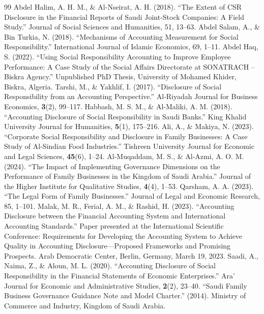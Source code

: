 \documentclass{NSP1}
\begin{document}
\begin{thebibliography}{99}
 Abdel Halim, A. H. M., \& Al-Nseirat, A. H. (2018). ``The Extent of CSR Disclosure in the Financial Reports of Saudi Joint-Stock Companies: A Field Study.'' Journal of Social Sciences and Humanities, 51, 13--63.
 Abdel Salam, A., \& Bin Turkia, N. (2018). ``Mechanisms of Accounting Measurement for Social Responsibility.'' International Journal of Islamic Economics, 69, 1--11.
 Abdel Haq, S. (2022). ``Using Social Responsibility Accounting to Improve Employee Performance: A Case Study of the Social Affairs Directorate at SONATRACH -- Biskra Agency.'' Unpublished PhD Thesis, University of Mohamed Khider, Biskra, Algeria.
 Tarshi, M., \& Yakhlif, I. (2017). ``Disclosure of Social Responsibility from an Accounting Perspective.'' Al-Riyadah Journal for Business Economics, \textbf{3}(2), 99--117.
 Habbash, M. S. M., \& Al-Maliki, A. M. (2018). ``Accounting Disclosure of Social Responsibility in Saudi Banks.'' King Khalid University Journal for Humanities, \textbf{5}(1), 175--216.
 Ali, A., \& Makiya, N. (2023). ``Corporate Social Responsibility and Disclosure in Family Businesses: A Case Study of Al-Sindian Food Industries.'' Tishreen University Journal for Economic and Legal Sciences, \textbf{45}(6), 1--24.
 Al-Muqaddam, M. S., \& Al-Azmi, A. O. M. (2024). ``The Impact of Implementing Governance Dimensions on the Performance of Family Businesses in the Kingdom of Saudi Arabia.'' Journal of the Higher Institute for Qualitative Studies, \textbf{4}(4), 1--53.
 Qarsham, A. A. (2023). ``The Legal Form of Family Businesses.'' Journal of Legal and Economic Research, 85, 1--101.
 Malak, M. R., Ferial, A. M., \& Rashid, H. (2023). ``Accounting Disclosure between the Financial Accounting System and International Accounting Standards.'' Paper presented at the International Scientific Conference: Requirements for Developing the Accounting System to Achieve Quality in Accounting Disclosure---Proposed Frameworks and Promising Prospects. Arab Democratic Center, Berlin, Germany, March 19, 2023.
 Saadi, A., Naima, Z., \& Aloun, M. L. (2020). ``Accounting Disclosure of Social Responsibility in the Financial Statements of Economic Enterprises.'' Ara' Journal for Economic and Administrative Studies, \textbf{2}(2), 23--40.
 ``Saudi Family Business Governance Guidance Note and Model Charter.'' (2014). Ministry of Commerce and Industry, Kingdom of Saudi Arabia.

\end{thebibliography}
\end{document}
